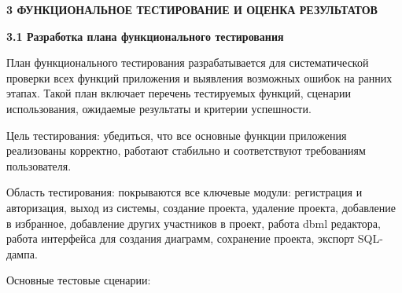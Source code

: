 \newpage
\begin{center}
  \textbf{3 ФУНКЦИОНАЛЬНОЕ ТЕСТИРОВАНИЕ И ОЦЕНКА РЕЗУЛЬТАТОВ}
\end{center}

\textbf{3.1 Разработка плана функционального тестирования}


План функционального тестирования разрабатывается для
систематической проверки всех функций приложения и выявления возможных
ошибок на ранних этапах. Такой план включает перечень тестируемых
функций, сценарии использования, ожидаемые результаты и критерии
успешности.

Цель тестирования: убедиться, что все основные функции приложения
реализованы корректно, работают стабильно и соответствуют требованиям
пользователя.

Область тестирования: покрываются все ключевые модули: регистрация
и авторизация, выход из системы, создание проекта, удаление проекта, добавление в избранное, добавление других участников в проект, работа dbml редактора, работа интерфейса для создания диаграмм, сохранение проекта, экспорт SQL-дампа.

Основные тестовые сценарии:


